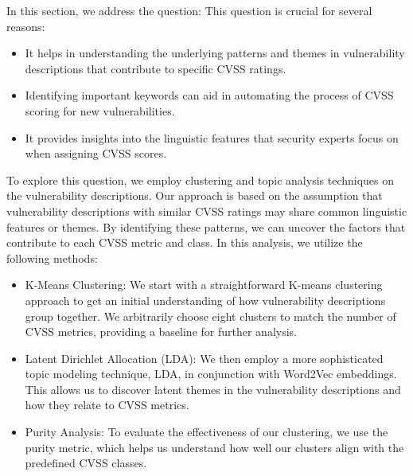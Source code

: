 In this section, we address the question:  This question is crucial for several reasons:

\begin{itemize}
	\item It helps in understanding the underlying patterns and themes in vulnerability descriptions that contribute to specific CVSS ratings.
	\item Identifying important keywords can aid in automating the process of CVSS scoring for new vulnerabilities.
	\item It provides insights into the linguistic features that security experts focus on when assigning CVSS scores.
\end{itemize}


To explore this question, we employ clustering and topic analysis techniques on the vulnerability
descriptions. Our approach is based on the assumption that vulnerability descriptions with similar CVSS ratings may share common linguistic features or themes. By identifying these patterns, we can uncover the factors that contribute to each CVSS metric and class. In this analysis, we utilize the following methods:

\begin{itemize}

	\item	K-Means Clustering: We start with a straightforward K-means clustering approach to get an initial understanding of how vulnerability descriptions group together. We arbitrarily choose eight clusters to match the number of CVSS metrics, providing a baseline for further analysis.

	\item Latent Dirichlet Allocation (LDA): We then employ a more sophisticated topic modeling technique, LDA, in conjunction with Word2Vec embeddings. This allows us to discover latent themes in the vulnerability descriptions and how they relate to CVSS metrics.

	\item Purity Analysis: To evaluate the effectiveness of our clustering, we use the purity metric, which helps us understand how well our clusters align with the predefined CVSS classes.
\end{itemize}

